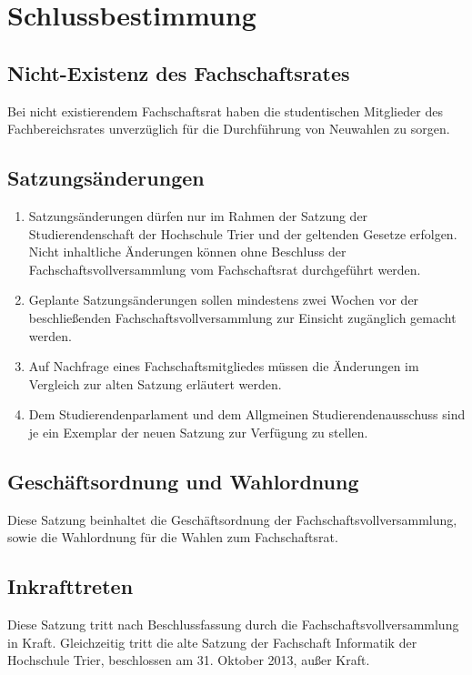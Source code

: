 \section{Schlussbestimmung}
\subsection{Nicht-Existenz des Fachschaftsrates}
Bei nicht existierendem Fachschaftsrat haben die studentischen Mitglieder des Fachbereichsrates unverzüglich für die Durchführung von Neuwahlen zu sorgen.

\subsection{Satzungsänderungen}
\begin{enumerate}
	\item Satzungsänderungen dürfen nur im Rahmen der Satzung der Studierendenschaft der Hochschule Trier und der geltenden Gesetze erfolgen. Nicht inhaltliche Änderungen können ohne Beschluss der Fachschaftsvollversammlung vom Fachschaftsrat durchgeführt werden.
	\item Geplante Satzungsänderungen sollen mindestens zwei Wochen vor der beschließenden Fachschaftsvollversammlung zur Einsicht zugänglich gemacht werden.
	\item Auf Nachfrage eines Fachschaftsmitgliedes müssen die Änderungen im Vergleich zur alten Satzung erläutert werden.
	\item Dem Studierendenparlament und dem Allgmeinen Studierendenausschuss sind je ein Exemplar der neuen Satzung zur Verfügung zu stellen.
\end{enumerate}

\subsection{Geschäftsordnung und Wahlordnung}
Diese Satzung beinhaltet die Geschäftsordnung der Fachschaftsvollversammlung, sowie die Wahlordnung für die Wahlen zum Fachschaftsrat.

\subsection{Inkrafttreten}
Diese Satzung tritt nach Beschlussfassung durch die Fachschaftsvollversammlung in Kraft. Gleichzeitig tritt die alte Satzung der Fachschaft Informatik der Hochschule Trier, beschlossen am 31. Oktober 2013, außer Kraft.
